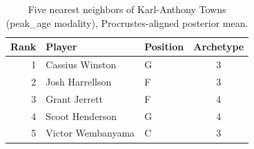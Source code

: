 \begin{table}[htbp]
  \centering\small
  \begin{tabular}{rllc}
    \toprule
    Rank & Player & Position & Archetype \\
    \midrule
    1 & Cassius Winston & G & 3 \\
    2 & Josh Harrellson & F & 3 \\
    3 & Grant Jerrett & F & 4 \\
    4 & Scoot Henderson & G & 4 \\
    5 & Victor Wembanyama & C & 3 \\
    \bottomrule
  \end{tabular}
  \caption{Five nearest neighbors of Karl-Anthony Towns (peak_age modality), Procrustes-aligned posterior mean.}
  \label{tab:Karl_Anthony_Towns_neighbors_peak_age}
\end{table}


